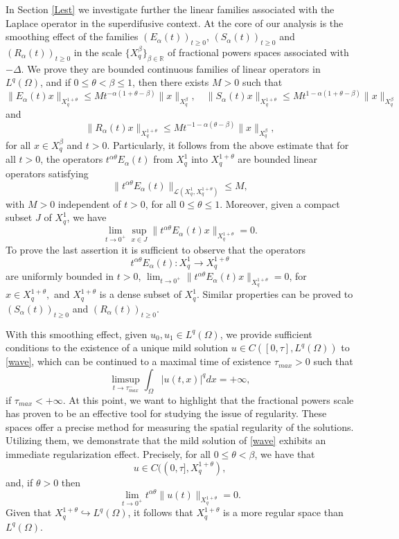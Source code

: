 \documentclass[12pt,reqno]{amsart}
\newcommand{\R}{\mathbb{R}}	%
\begin{document}
In Section \ref{Lest} we investigate further the linear families associated with the Laplace operator in the superdifusive context. At the core of our analysis is the smoothing effect of the families $(E_{\alpha}(t))_{t\ge0}$, $(S_{\alpha}(t))_{t\ge0}$ and $(R_{\alpha}(t))_{t\ge0}$ in the scale $\{X_{q}^{\beta}\}_{\beta\in\R}$ of fractional powers spaces associated with $-\Delta$. We prove they are bounded continuous families of linear operators in $L^q(\Omega)$, and  if $0\le\theta<\beta\le 1$, then there exists $M>0$ such that
\begin{equation*}
	\|E_{\alpha}(t)x\|_{X^{1+\theta}_{q}}\leq Mt^{-\alpha(1+\theta-\beta)}\|x\|_{X^{\beta}_{q}},\quad \|S_{\alpha}(t)x\|_{X^{1+\theta}_{q}}\leq Mt^{1-\alpha(1+\theta-\beta)}\|x\|_{X^{\beta}_{q}}
\end{equation*}
and
\begin{equation*}
	\|R_{\alpha}(t)x\|_{X^{1+\theta}_{q}}\leq Mt^{-1-\alpha(\theta-\beta)}\|x\|_{X^{\beta}_{q}},
\end{equation*}
for all $x\in X^{\beta}_{q}$ and $t>0$. 	Particularly, it follows from the above estimate that for all $t>0$, the operators $t^{\alpha\theta}E_{\alpha}(t)$ from $X^{1}_{q}$ into $X^{1+\theta}_{q}$ are bounded linear operators satisfying
$$\|t^{\alpha\theta}E_{\alpha}(t)\|_{\mathcal{L}(X^{1}_{q},X^{1+\theta}_{q})}\le M,$$
with $M>0$ independent of $t>0$, for all $0\le\theta\le 1$. Moreover, given a compact subset $J$ of $X^{1}_{q}$, we have
$$\lim_{t\to0^{+}}\sup_{x\in J}\|t^{\alpha\theta}E_{\alpha}(t)x\|_{X^{1+\theta}_{q}}=0.$$
To prove the last assertion it is sufficient to observe that the operators $$t^{\alpha\theta}E_{\alpha}(t):X^{1}_{q}\to X^{1+\theta}_{q}$$ are uniformly bounded in $t>0$,  $\lim_{t\to0^{+}}\|t^{\alpha\theta}E_{\alpha}(t)x\|_{X^{1+\theta}_{q}}=0$, for  $x\in X^{1+\theta}_{q},$
and $X^{1+\theta}_{q}$ is a dense subset of $X^{1}_{q}$. Similar properties can be proved to $(S_{\alpha}(t))_{t\ge0}$ and $(R_{\alpha}(t))_{t\ge0}$.


With this smoothing effect, given $u_0,u_1\in L^{q}(\Omega)$, we provide sufficient conditions to the existence of a unique mild solution $u\in C([0,\tau ], L^{q}(\Omega))$ to \eqref{wave},	 			which can be continued to a maximal time of existence $\tau_{max}>0$ such that
$$\limsup_{t\rightarrow \tau_{max}^{-}}\int_{\Omega}|u(t,x)|^{q}dx=+\infty,$$%
if $\tau_{max}<+\infty$. At this point, we want to highlight that the fractional powers scale has proven to be an effective tool for studying the issue of regularity. These spaces offer a precise method for measuring the spatial regularity of the solutions. Utilizing them, we demonstrate that the mild solution of \eqref{wave} exhibits an immediate regularization effect. Precisely, for all $0\le\theta<\beta$, we have that
$$u\in C((0,\tau ],X_{q}^{1+\theta}),$$
and, if $\theta>0$ then
$$\lim_{t\to0^{+}}t^{\alpha\theta}\|u(t)\|_{X_{q}^{1+\theta}}= 0.$$
Given that $X_{q}^{1+\theta}\hookrightarrow L^q(\Omega)$, it follows that $X_{q}^{1+\theta}$ is a more regular space than $L^q(\Omega)$. 
			
\end{document}
